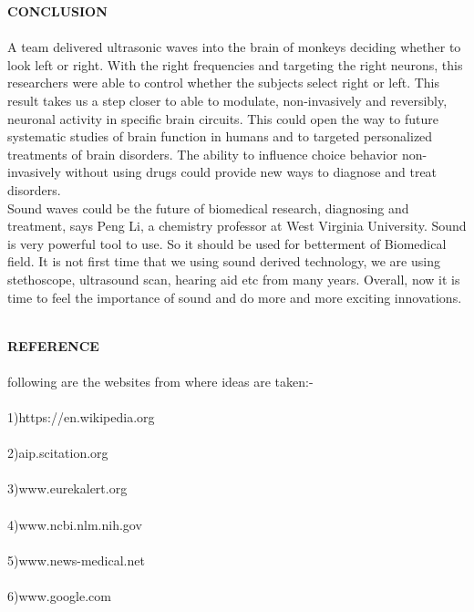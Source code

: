 \documentclass[12pt]{article}
\begin{document}
\begin{large}
 \clearpage
 
 {\large \textbf{CONCLUSION}}\\
 \\
 {\large A team delivered ultrasonic waves into the brain of monkeys deciding whether to look left or right. With the right frequencies and targeting the right neurons, this researchers were able to control whether the subjects select right or left. This result takes us a step closer to able to modulate, non-invasively and reversibly, neuronal activity in specific brain circuits. This could open the way to future systematic studies of brain function in humans and to targeted personalized treatments of brain disorders. The ability to influence choice behavior non-invasively without using drugs could provide new ways to diagnose and treat disorders. \\
 
 Sound waves could be the future of biomedical research, diagnosing and treatment, says Peng Li, a chemistry professor at West Virginia University. Sound is very powerful tool to use. So it should be used for betterment of Biomedical field. It is not first time that we using  sound derived technology, we are using stethoscope, ultrasound scan, hearing aid etc from many years. Overall, now it is time to feel the importance of sound and do more and more exciting innovations.}\\
 \\
 \clearpage
 
\begin{large}
\textbf{ REFERENCE }\\
\\
following are the websites from where ideas are taken:-
\\
\\
1)https://en.wikipedia.org\\
\\
2)aip.scitation.org\\
\\
3)www.eurekalert.org\\
\\
4)www.ncbi.nlm.nih.gov\\
\\
5)www.news-medical.net\\
\\
6)www.google.com\\
\end{large}




\end{large}
\end{document}
